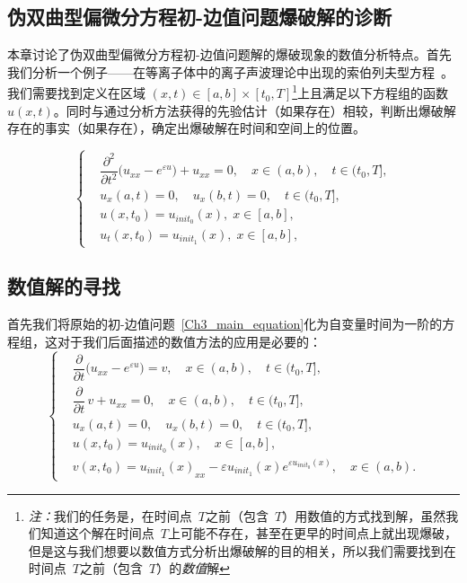 \documentclass[twoside]{book}
\begin{document}
\begin{CJK*}{GBK}{song}

\newpage
\chapter{伪双曲型偏微分方程初-边值问题爆破解的诊断}\label{Chapter_3}

 本章讨论了伪双曲型偏微分方程初-边值问题解的爆破现象的数值分析特点。首先我们分析一个例子——在等离子体中的离子声波理论中出现的索伯列夫型方程~\cite{Lukyanenko_1}。我们需要找到定义在区域 $(x,t) \in [a,b] \times [t_0,T]$\footnote{\emph{注：}我们的任务是，在时间点~$T$之前（包含~$T$）用数值的方式找到解，虽然我们知道这个解在时间点~$T$上可能不存在，甚至在更早的时间点上就出现爆破，但是这与我们想要以数值方式分析出爆破解的目的相关，所以我们需要找到在时间点~$T$之前（包含~$T$）的\emph{数值\/}解}上且满足以下方程组的函数 $u(x,t)$。同时与通过分析方法获得的先验估计（如果存在）相较，判断出爆破解存在的事实（如果存在），确定出爆破解在时间和空间上的位置。

	
	\begin{equation}
	\label{Ch3_main_equation}
	\left\{
	\begin{aligned}
	&\dfrac{\partial^2}{\partial t^2} \Big(u_{xx} - e^{\varepsilon u}\Big) + u_{xx} = 0, \quad x \in (a,b), \quad t \in (t_0,T], \\
	&u_x(a,t) = 0, \quad u_x(b,t) = 0, \quad t \in (t_0,T], \\
	&u(x,t_0) = u_{init_0}(x), \; x \in [a,b],\\
	&u_t(x,t_0) = u_{init_1}(x), \; x \in [a,b],
	\end{aligned}
	\right.
	\end{equation}
	
\section{数值解的寻找} \label{Ch_3_Numerical_solving}
	首先我们将原始的初-边值问题~\eqref{Ch3_main_equation}化为自变量时间为一阶的方程组，这对于我们后面描述的数值方法的应用是必要的：
	\begin{equation}
	\label{Ch3_reduced_equation_V1}
	\left\{
	\begin{aligned}
	&\dfrac{\partial}{\partial t} \Big(u_{xx} - e^{\varepsilon u}\Big) = v, \quad x \in (a,b), \quad t \in (t_0,T], \\
	&\dfrac{\partial}{\partial t} \, v + u_{xx} = 0, \quad x \in (a,b), \quad t \in (t_0,T], \\
	&u_x(a,t) = 0, \quad u_x(b,t) = 0, \quad t \in (t_0,T],\\
	&u(x,t_0) = u_{init_0}(x), \quad x \in [a,b],\\
	&v(x,t_0) = {u_{init_1}(x)}_{xx} -\varepsilon u_{init_1}(x) e^{\varepsilon u_{init_0}(x)}, \quad x \in (a,b).
	\end{aligned}
	\right.
	\end{equation}
	

\end{CJK*}
\end{document}
